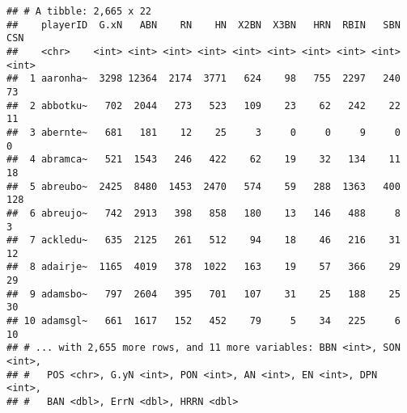 \documentclass[]{book}
\newenvironment{Shaded}{\begin{snugshade}}{\end{snugshade}}
\newcommand{\KeywordTok}[1]{\textcolor[rgb]{0.13,0.29,0.53}{\textbf{#1}}}
\newcommand{\DataTypeTok}[1]{\textcolor[rgb]{0.13,0.29,0.53}{#1}}
\newcommand{\StringTok}[1]{\textcolor[rgb]{0.31,0.60,0.02}{#1}}
\newcommand{\OperatorTok}[1]{\textcolor[rgb]{0.81,0.36,0.00}{\textbf{#1}}}
\newcommand{\NormalTok}[1]{#1}
\begin{document}
\begin{Shaded}
\end{Shaded}

\begin{verbatim}
## # A tibble: 2,665 x 22
##    playerID  G.xN   ABN    RN    HN  X2BN  X3BN   HRN  RBIN   SBN   CSN
##    <chr>    <int> <int> <int> <int> <int> <int> <int> <int> <int> <int>
##  1 aaronha~  3298 12364  2174  3771   624    98   755  2297   240    73
##  2 abbotku~   702  2044   273   523   109    23    62   242    22    11
##  3 abernte~   681   181    12    25     3     0     0     9     0     0
##  4 abramca~   521  1543   246   422    62    19    32   134    11    18
##  5 abreubo~  2425  8480  1453  2470   574    59   288  1363   400   128
##  6 abreujo~   742  2913   398   858   180    13   146   488     8     3
##  7 ackledu~   635  2125   261   512    94    18    46   216    31    12
##  8 adairje~  1165  4019   378  1022   163    19    57   366    29    29
##  9 adamsbo~   797  2604   395   701   107    31    25   188    25    30
## 10 adamsgl~   661  1617   152   452    79     5    34   225     6    10
## # ... with 2,655 more rows, and 11 more variables: BBN <int>, SON <int>,
## #   POS <chr>, G.yN <int>, PON <int>, AN <int>, EN <int>, DPN <int>,
## #   BAN <dbl>, ErrN <dbl>, HRRN <dbl>
\end{verbatim}

\begin{Shaded}
\end{Shaded}
\end{document}
